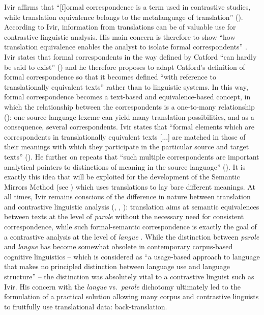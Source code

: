 Ivir affirms that “[f]ormal correspondence is a term used in contrastive studies, while translation equivalence belongs to the metalanguage of translation” (\citeyear[51]{ivir_formal_1981}). According to Ivir, information from translations can be of valuable use for contrastive linguistic analysis. His main concern is therefore to show “how translation equivalence enables the analyst to isolate formal correspondents” \citep[58]{ivir_formal_1981}. Ivir states that formal correspondents in the way defined by Catford “can hardly be said to exist” (\citeyear[54]{ivir_formal_1981}) and he therefore proposes to adapt Catford’s definition of formal correspondence so that it becomes defined “with reference to translationally equivalent texts” \citep[55]{ivir_formal_1981} rather than to linguistic systems. In this way, formal correspondence becomes a text-based and equivalence-based concept, in which the relationship between the correspondents is a one-to-many relationship (\citeyear[55]{ivir_formal_1981}): one source language lexeme can yield many translation possibilities, and as a consequence, several correspondents. Ivir states that “formal elements which are correspondents in translationally equivalent texts [...] are matched in those of their meanings with which they participate in the particular source and target texts” (\citeyear[55]{ivir_formal_1981}). He further on repeats that “such multiple correspondents are important analytical pointers to distinctions of meaning in the source language” (\citeyear[56]{ivir_formal_1981}). It is exactly this idea that will be exploited for the development of the Semantic Mirrors Method (see ) which uses translations to lay bare different meanings. At all times, Ivir remains conscious of the difference in nature between translation and contrastive linguistic analysis (\citealt[15]{ivir_contrasting_1969}, \citealt[17]{ivir_remarks_1970}, \citealt[173]{ivir_translation-based_1983}): translation aims at semantic equivalences between texts at the level of \textit{parole} without the necessary need for consistent correspondence, while such formal-semantic correspondence is exactly the goal of a contrastive analysis at the level of \textit{langue} \citep[15]{ivir_contrasting_1969}. While the distinction between \textit{parole} and \textit{langue} has become somewhat obsolete in contemporary corpus-based cognitive linguistics – which is considered as “a usage-based approach to language that makes no principled distinction between language use and language structure” \citep[151]{glynn_visualizing_2014} – the distinction was absolutely vital to a contrastive linguist such as Ivir. His concern with the \textit{langue} vs.\ \textit{parole} dichotomy ultimately led to the formulation of a practical solution allowing many corpus and contrastive linguists to fruitfully use translational data: back-translation.

